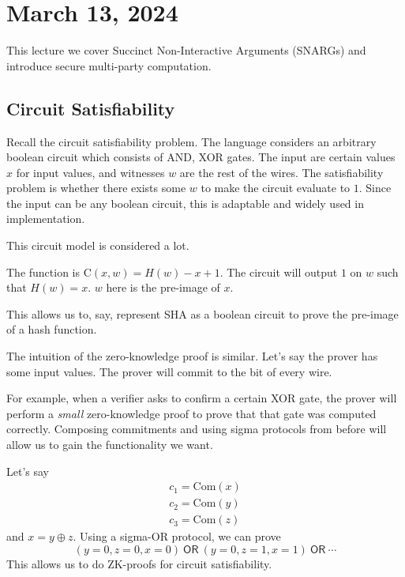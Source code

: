 \section{March 13, 2024}
\label{20240313}

This lecture we cover Succinct Non-Interactive Arguments (SNARGs) and introduce secure multi-party computation.

\subsection{Circuit Satisfiability}
Recall the circuit satisfiability problem. The language considers an arbitrary boolean circuit which consists of \textsf{AND}, \textsf{XOR} gates. The input are certain values $x$ for input values, and witnesses $w$ are the rest of the wires. The satisfiability problem is whether there exists some $w$ to make the circuit evaluate to $1$. Since the input can be any boolean circuit, this is adaptable and widely used in implementation.


This circuit model is considered a lot.
\begin{example}
    The function is $\mathrm{C}(x,w) = H(w) - x + 1$. The circuit will output $1$ on $w$ such that $H(w) = x$. $w$ here is the pre-image of $x$.

    This allows us to, say, represent SHA as a boolean circuit to prove the pre-image of a hash function.
\end{example}

The intuition of the zero-knowledge proof is similar. Let's say the prover has some input values. The prover will commit to the bit of every wire.

For example, when a verifier asks to confirm a certain \textsf{XOR} gate, the prover will perform a \emph{small} zero-knowledge proof to prove that that gate was computed correctly. Composing commitments and using sigma protocols from before will allow us to gain the functionality we want.

Let's say
\begin{align*}
    c_1 = \mathrm{Com}(x) \\
    c_2 = \mathrm{Com}(y) \\
    c_3 = \mathrm{Com}(z)
\end{align*}
and $x = y\oplus z$. Using a sigma-\textsf{OR} protocol, we can prove
\[(y = 0, z = 0, x = 0)\ \mathsf{OR}\ (y = 0, z = 1, x = 1)\ \mathsf{OR}\ \cdots\]
This allows us to do ZK-proofs for circuit satisfiability.

